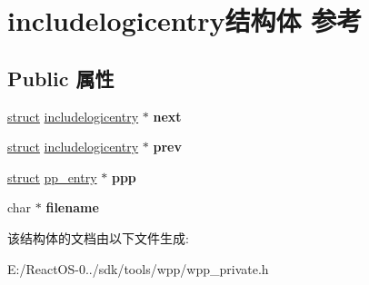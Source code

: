 \hypertarget{structincludelogicentry}{}\section{includelogicentry结构体 参考}
\label{structincludelogicentry}
\subsection*{Public 属性}
\begin{DoxyCompactItemize}
\item 
\mbox{\label{structincludelogicentry_a5b80fca446a104ddb932cafe62ad87fb}} 
\hyperlink{interfacestruct}{struct} \hyperlink{structincludelogicentry}{includelogicentry} $\ast$ {\bfseries next}
\item 
\mbox{\label{structincludelogicentry_ac1f4a07930a95d8660fe56940939deb3}} 
\hyperlink{interfacestruct}{struct} \hyperlink{structincludelogicentry}{includelogicentry} $\ast$ {\bfseries prev}
\item 
\mbox{\label{structincludelogicentry_a1181a4da50c763dcb4ade8e8c9dfc78c}} 
\hyperlink{interfacestruct}{struct} \hyperlink{structpp__entry}{pp\+\_\+entry} $\ast$ {\bfseries ppp}
\item 
\mbox{\label{structincludelogicentry_ae9e2b2315edf788d8dad850d7a9ed993}} 
char $\ast$ {\bfseries filename}
\end{DoxyCompactItemize}


该结构体的文档由以下文件生成\+:\begin{DoxyCompactItemize}
\item 
E\+:/\+React\+O\+S-\/0../sdk/tools/wpp/wpp\+\_\+private.\+h\end{DoxyCompactItemize}
